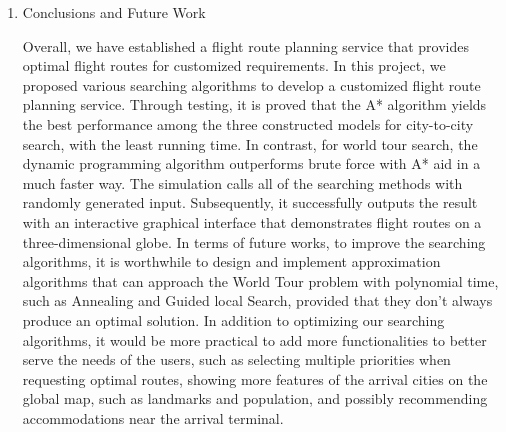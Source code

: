 \documentclass[fontsize=11pt]{article}
\begin{document}
\begin{enumerate}
            \newpage
            \item Conclusions and Future Work
            
            Overall, we have established a flight route planning service that provides optimal flight routes for customized requirements. In this project, we proposed various searching algorithms to develop a customized flight route planning service. Through testing, it is proved that the A* algorithm yields the best performance among the three constructed models for city-to-city search, with the least running time. In contrast, for world tour search, the dynamic programming algorithm outperforms brute force with A* aid in a much faster way. The simulation calls all of the searching methods with randomly generated input. Subsequently, it successfully outputs the result with an interactive graphical interface that demonstrates flight routes on a three-dimensional globe. In terms of future works, to improve the searching algorithms, it is worthwhile to design and implement approximation algorithms that can approach the World Tour problem with polynomial time, such as Annealing and Guided local Search, provided that they don't always produce an optimal solution. In addition to optimizing our searching algorithms, it would be more practical to add more functionalities to better serve the needs of the users, such as selecting multiple priorities when requesting optimal routes, showing more features of the arrival cities on the global map, such as landmarks and population, and possibly recommending accommodations near the arrival terminal.
    \end{enumerate}
\end{document}
